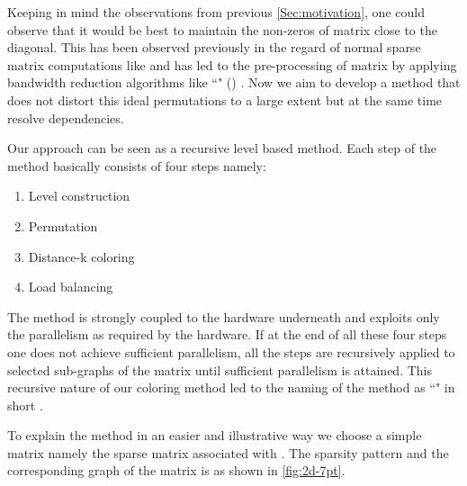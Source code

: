 Keeping in mind the observations from previous \cref{Sec:motivation}, one could observe that it would be best to maintain the non-zeros of matrix close to the diagonal. This has been observed previously in the regard of normal sparse matrix computations like \SpMV and has led to the pre-processing of matrix by applying bandwidth reduction algorithms like ``\RCMfull" (\RCM) \cite{RCM,RCM_Sparse_computation}. Now we aim to develop a method that does not distort this ideal permutations to a large extent but at the same time resolve \DK dependencies. 
 
Our approach can be seen as a recursive level based method. Each step of the method basically consists of four steps namely:
\begin{enumerate}
	\item Level construction
	\item Permutation
	\item Distance-k coloring
	\item Load balancing
\end{enumerate}
The method is strongly coupled to the hardware underneath and exploits only the parallelism as required by the hardware. If at the end of all these four steps one does not achieve sufficient parallelism, all the steps are recursively applied to selected sub-graphs of the matrix until sufficient parallelism is attained. This recursive nature of our coloring method led to the naming of the method as ``\RACfull" in short \RAC.

To explain the method in an easier and illustrative way we choose a simple matrix namely the sparse matrix associated with \STEX. The sparsity pattern and the corresponding graph of the matrix is as shown in \cref{fig:2d-7pt}.

